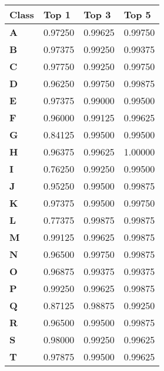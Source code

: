 \documentclass[12pt]{article}
\numberwithin{equation}{section}
\numberwithin{figure}{section}
\numberwithin{table}{section}
\begin{document}
\begin{table}[]
  \centering
  \begin{tabular}{|l|l|l|l|}
  \hline
  \textbf{Class} & \textbf{Top 1} & \textbf{Top 3} & \textbf{Top 5} \\ \hline
  \textbf{A}     & 0.97250        & 0.99625        & 0.99750        \\ \hline
  \textbf{B}     & 0.97375        & 0.99250        & 0.99375        \\ \hline
  \textbf{C}     & 0.97750        & 0.99250        & 0.99750        \\ \hline
  \textbf{D}     & 0.96250        & 0.99750        & 0.99875        \\ \hline
  \textbf{E}     & 0.97375        & 0.99000        & 0.99500        \\ \hline
  \textbf{F}     & 0.96000        & 0.99125        & 0.99625        \\ \hline
  \textbf{G}     & 0.84125        & 0.99500        & 0.99500        \\ \hline
  \textbf{H}     & 0.96375        & 0.99625        & 1.00000        \\ \hline
  \textbf{I}     & 0.76250        & 0.99250        & 0.99500        \\ \hline
  \textbf{J}     & 0.95250        & 0.99500        & 0.99875        \\ \hline
  \textbf{K}     & 0.97375        & 0.99500        & 0.99750        \\ \hline
  \textbf{L}     & 0.77375        & 0.99875        & 0.99875        \\ \hline
  \textbf{M}     & 0.99125        & 0.99625        & 0.99875        \\ \hline
  \textbf{N}     & 0.96500        & 0.99750        & 0.99875        \\ \hline
  \textbf{O}     & 0.96875        & 0.99375        & 0.99375        \\ \hline
  \textbf{P}     & 0.99250        & 0.99625        & 0.99875        \\ \hline
  \textbf{Q}     & 0.87125        & 0.98875        & 0.99250        \\ \hline
  \textbf{R}     & 0.96500        & 0.99500        & 0.99875        \\ \hline
  \textbf{S}     & 0.98000        & 0.99250        & 0.99625        \\ \hline
  \textbf{T}     & 0.97875        & 0.99500        & 0.99625        \\ \hline

\end{tabular}
\end{table}
\end{document}
